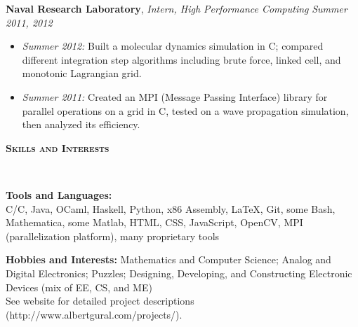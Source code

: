 \documentclass{article}
\newenvironment{changemargin}[2]{%
  \begin{list}{}{%
    \setlength{\topsep}{0pt}%
    \setlength{\leftmargin}{#1}%
    \setlength{\rightmargin}{#2}%
    \setlength{\listparindent}{\parindent}%
    \setlength{\itemindent}{\parindent}%
    \setlength{\parsep}{\parskip}%
  }%
  \item[]}{\end{list}
}
\newcommand{\lineover}{
	\begin{changemargin}{-0.05in}{-0.05in}
		\vspace*{-8pt}
		\hrulefill \\
		\vspace*{-2pt}
	\end{changemargin}
}
\newcommand{\header}[1]{
	\begin{changemargin}{-0.5in}{-0.5in}
		{\large \textbf{\scshape{#1}}}\\
  	\lineover
	\end{changemargin}
}
\newenvironment{body} {
	\vspace*{-16pt}
	\begin{changemargin}{-0.25in}{-0.5in}
  }	
	{\end{changemargin}
}
\newcommand{\CC}{C\nolinebreak\hspace{-.05em}\raisebox{.4ex}{\tiny\bf +}\nolinebreak\hspace{-.10em}\raisebox{.4ex}{\tiny\bf +}}
\begin{document}
\begin{body}
	\textbf{Naval Research Laboratory}, \emph{Intern, High Performance Computing} \hfill \emph{Summer 2011, 2012}\\
	\vspace*{-4pt}
	\begin{itemize}
		\item \emph{Summer 2012:} Built a molecular dynamics simulation in C; compared different integration step algorithms including brute force, linked cell, and monotonic Lagrangian grid.
		\item \emph{Summer 2011:} Created an MPI (Message Passing Interface) library for parallel operations on a grid in \CC, tested on a wave propagation simulation, then analyzed its efficiency.
	\end{itemize}
\end{body}

\smallskip


\header{Skills and Interests}

\begin{body}
	\vspace{14pt}
	\textbf{Tools and Languages:} \\
	C/\CC, Java, OCaml, Haskell, Python, x86 Assembly, \LaTeX, Git, some Bash, Mathematica, some Matlab, HTML, CSS, JavaScript, OpenCV, MPI (parallelization platform), many proprietary tools \\
	
	\medskip
	
	\textbf{Hobbies and Interests:} Mathematics and Computer Science; Analog and Digital Electronics; Puzzles; Designing, Developing, and Constructing Electronic Devices (mix of EE, CS, and ME) \\ See website for detailed project descriptions (http://www.albertgural.com/projects/). \\
\end{body}

\smallskip
\end{document}
